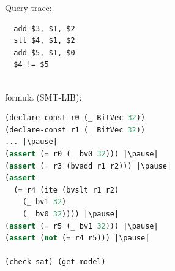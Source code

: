 \documentclass[pdf]{beamer}
\begin{document}
\begin{frame}[fragile]{Query}
\normalsize
trace:
\begin{lstlisting}
  add $3, $1, $2
  slt $4, $1, $2
  add $5, $1, $0
  $4 != $5
\end{lstlisting}

\pause
~\\

formula (SMT-LIB):
\begin{lstlisting}[language=Lisp, escapeinside=||]
(declare-const r0 (_ BitVec 32))
(declare-const r1 (_ BitVec 32))
... |\pause|
(assert (= r0 (_ bv0 32))) |\pause|
(assert (= r3 (bvadd r1 r2))) |\pause|
(assert
  (= r4 (ite (bvslt r1 r2)
    (_ bv1 32)
    (_ bv0 32)))) |\pause|
(assert (= r5 (_ bv1 32))) |\pause|
(assert (not (= r4 r5))) |\pause|

(check-sat) (get-model)
\end{lstlisting}
\end{frame}
\end{document}
